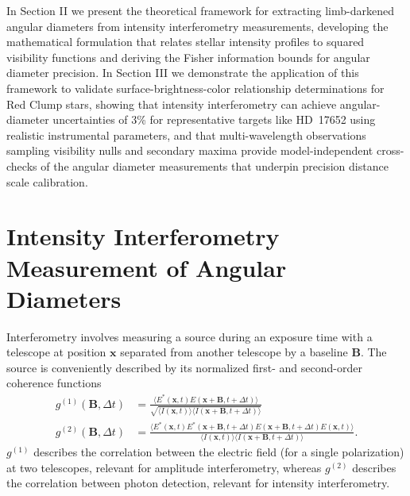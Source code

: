\documentclass[linenumbers,trackchanges]{aastex701}
\begin{document}
In Section II we present the theoretical framework for extracting limb-darkened angular diameters from intensity interferometry measurements, developing the mathematical formulation that relates stellar intensity profiles to squared visibility functions and deriving the Fisher information bounds for angular diameter precision. In Section III we demonstrate the application of this framework to validate surface-brightness-color relationship determinations for Red Clump stars, showing that intensity interferometry can achieve angular-diameter uncertainties of 3\% for representative targets like HD~17652 using realistic instrumental parameters, and that multi-wavelength observations sampling visibility nulls and secondary maxima provide model-independent cross-checks of the angular diameter measurements that underpin precision distance scale calibration.

\section{Intensity Interferometry Measurement of Angular Diameters}
Interferometry involves measuring a source during an exposure time with a telescope at position $\mathbf{x}$ separated from another telescope by a baseline $\mathbf{B}$.
The source is conveniently described by its normalized first- and second-order coherence functions
\begin{align}
    g^{(1)}(\mathbf{B},\Delta t) & = \frac{\langle E^*(\mathbf{x},t) E(\mathbf{x}+\mathbf{B}, t+\Delta t)\rangle}
    {\sqrt{\langle I(\mathbf{x},t)\rangle \langle I(\mathbf{x}+\mathbf{B}, t+\Delta t)\rangle}}\\
    g^{(2)}(\mathbf{B},\Delta t) & = \frac{\langle E^*(\mathbf{x},t)  E^*(\mathbf{x}+\mathbf{B}, t+\Delta t) E(\mathbf{x}+\mathbf{B}, t+\Delta t) E(\mathbf{x},t) \rangle}
    {\langle I(\mathbf{x},t)\rangle \langle I(\mathbf{x}+\mathbf{B}, t+\Delta t)\rangle}.
\end{align}
$g^{(1)}$ describes the correlation between the electric field (for a single polarization) at two telescopes, relevant for amplitude interferometry,
whereas $g^{(2)}$ describes the correlation between photon detection, relevant for intensity interferometry.
\end{document}
